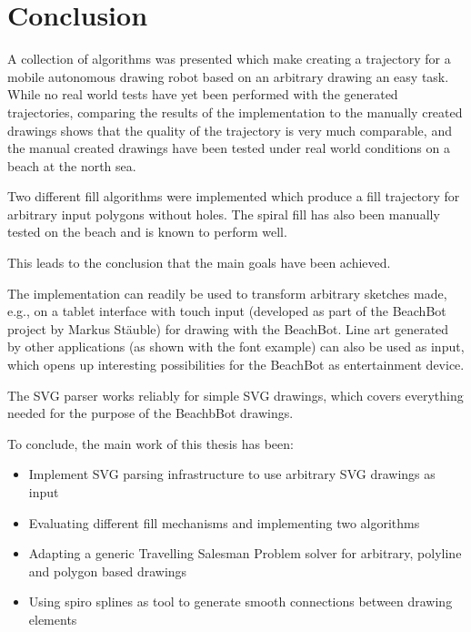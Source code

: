 \chapter{Conclusion}

A collection of algorithms was presented which make creating a trajectory for a mobile autonomous drawing robot based on an arbitrary drawing an easy task. While no real world tests have yet been performed with the generated trajectories, comparing the results of the implementation to the manually created drawings shows that the quality of the trajectory is very much comparable, and the manual created drawings have been tested under real world conditions on a beach at the north sea. 

Two different fill algorithms were implemented which produce a fill trajectory for arbitrary input polygons without holes. The spiral fill has also been manually tested on the beach and is known to perform well.


This leads to the conclusion that the main goals have been achieved.

The implementation can readily be used to transform arbitrary sketches made, e.g., on a tablet interface with touch input (developed as part of the BeachBot project by Markus Stäuble) for drawing with the BeachBot. Line art generated by other applications (as shown with the font example) can also be used as input, which opens up interesting possibilities for the BeachBot as entertainment device.

The SVG parser works reliably for simple SVG drawings, which covers everything needed for the purpose of the BeachbBot drawings.


To conclude, the main work of this thesis has been:

\begin{itemize}
\item Implement SVG parsing infrastructure to use arbitrary SVG drawings as input
\item Evaluating different fill mechanisms and implementing two algorithms
\item Adapting a generic Travelling Salesman Problem solver for arbitrary, polyline and polygon based drawings
\item Using spiro splines as tool to generate smooth connections between drawing elements
\end{itemize}


